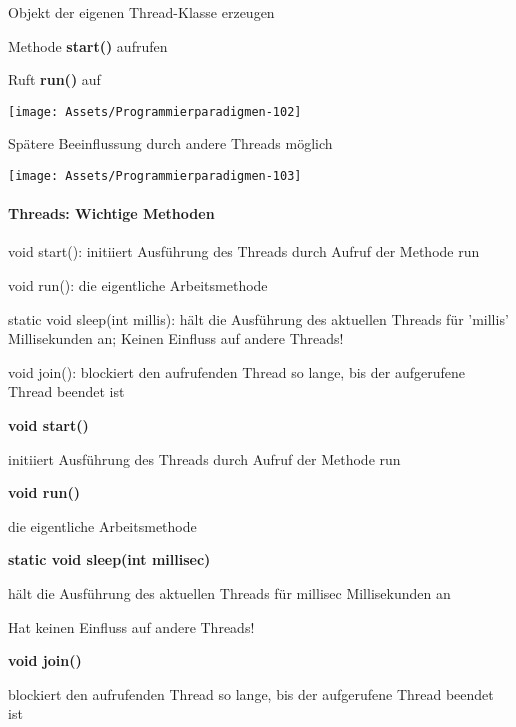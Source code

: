 \documentclass[10pt]{article}
\begin{document}
\begin{itemize*}
  \item Objekt der eigenen Thread-Klasse erzeugen
  \item Methode \textbf{start()} aufrufen
  \begin{itemize*}
    \item Ruft \textbf{run()} auf
  \end{itemize*}
  \begin{center}
    \centering
    \texttt{[image: Assets/Programmierparadigmen-102]}
  \end{center}
  \item Spätere Beeinflussung durch andere Threads möglich
  \begin{center}
    \centering
    \texttt{[image: Assets/Programmierparadigmen-103]}
  \end{center}
\end{itemize*}


\paragraph{Threads: Wichtige Methoden}
  \begin{itemize*}
    \item void start(): initiiert Ausführung des Threads durch Aufruf der Methode run
    \item void run(): die eigentliche Arbeitsmethode
    \item static void sleep(int millis): hält die Ausführung des aktuellen Threads für 'millis' Millisekunden an; Keinen Einfluss auf andere Threads!
    \item void join(): blockiert den aufrufenden Thread so lange, bis der aufgerufene Thread beendet ist
  \end{itemize*}

\begin{itemize*}
  \item \textbf{void start()}
  \begin{itemize*}
    \item initiiert Ausführung des Threads durch Aufruf der Methode run
  \end{itemize*}
  \item \textbf{void run()}
  \begin{itemize*}
    \item die eigentliche Arbeitsmethode
  \end{itemize*}
  \item \textbf{static void sleep(int millisec)}
  \begin{itemize*}
    \item hält die Ausführung des aktuellen Threads für millisec Millisekunden an
    \item Hat keinen Einfluss auf andere Threads!
  \end{itemize*}
  \item \textbf{void join()}
  \begin{itemize*}
    \item blockiert den aufrufenden Thread so lange, bis der aufgerufene Thread beendet ist
  \end{itemize*}
\end{itemize*}
\end{document}
